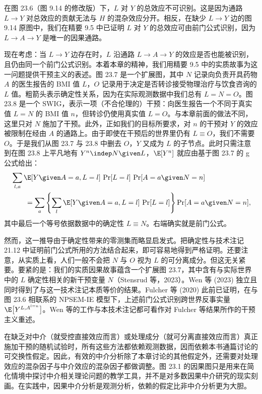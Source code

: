 \begin{techpoint}[路径特定效应与前门公式]
\setlength{\parindent}{2em}
在图 23.6（图 9.14 的修改版）下，$L$ 对 $Y$ 的总效应不可识别。这是因为通路 $L\rightarrow Y$ 对总效应的贡献无法与 $H$ 的混杂效应分开。相反，在缺少 $L\rightarrow Y$ 边的图 9.14 原图中，我们在精要 9.5 中已证明 $L$ 对 $Y$ 的总效应可由前门公式识别，因为 $L\rightarrow A\rightarrow Y$ 是唯一的因果通路。

现在考虑：当 $L\rightarrow Y$ 边存在时，$L$ 沿通路 $L\rightarrow A\rightarrow Y$ 的效应是否也能被识别，且仍由同一个前门公式识别。本着本章的精神，我们用精要 9.5 中的实质故事为这一问题提供干预主义的表述。图 23.7 是一个扩展图，其中 $N$ 记录向负责开具药物 $A$ 的医生报告的 BMI 值 $L$，$O$ 记录用于决定是否转诊接受物理治疗与饮食咨询的 $L$ 值。粗箭头表示确定性关系，因为在实际观测数据中我们总有 $L=N=O$。图 23.8 是一个 SWIG，表示一项（不合伦理的）干预：向医生报告一个不同于真实值 $L=N$ 的 BMI 值 $n$，但转诊仍使用真实值 $L=O$。与本章前面的做法不同，这里只对 $N$ 施加了干预。此外，正如我们的目标所要求，对 $n$ 的干预对 $Y$ 的效应被限制在经由 $A$ 的通路上。由于即使在干预后的世界里仍有 $L\equiv O$，我们不需要 $O$。于是我们从图 23.7 与 23.8 中删去 $O$，$Y$ 又成为 $L$ 的子节点。此时只需注意到在图 23.8 上平凡地有 $Y^{n}\indep N\given L$，$\E[Y^{n}]$ 就应由基于图 23.7 的 g 公式给出：
\begin{align*}
&\sum_{l,a} \E[Y\given A=a,L=l]\,\Pr[L=l]\,\Pr[A=a\given N=n]\\
&\qquad= \sum_a \left\{\sum_l \E[Y\given A=a,L=l]\,\Pr[L=l]\right\}\Pr[A=a\given N=n],
\end{align*}
其中最后一个等号依据数据中的确定性 $L\equiv N$。右端确实就是前门公式。

然而，这一推导由于确定性带来的零测集而略显启发式。把确定性与技术注记 21.12 中证明前门公式所用的方法结合起来，即可容易地得到严格证明。还要注意，从实质上看，人们一般不会把 $N$ 与 $O$ 视为 $L$ 的可分离成分。但这无关紧要。要紧的是：我们的实质因果故事蕴含一个扩展图 23.7，其中含有与实际世界中的 $L$ 确定性相关的新干预变量 $N$（Stensrud 等，2023）。Wen 等 (2023) 独立且同时得到了与这一技术注记本质等价的结果。Fulcher 等 (2020) 此前已证明，在与图 23.6 相联系的 NPSEM-IE 模型下，上述前门公式识别跨世界反事实量 $\E\big[Y^{L,A^{l=n}}\big]$。Wen 等的工作与本技术注记都可看作对 Fulcher 等结果所作的干预主义重述。
\end{techpoint}

在缺乏对中介（就受控直接效应而言）或处理成分（就可分离直接效应而言）真正施加干预的随机试验时，所有这些方法都依赖观测数据，因而依赖本书通篇讨论的可交换性假定。因此，有效的中介分析除了本章讨论的其他假定外，还需要对处理效应的混杂因子与中介效应的混杂因子都做调整。图 23.1 的因果图只是用来在简化情境中探讨中介相关理论问题的教学工具，并不是对多数因果中介研究的现实刻画。在实践中，因果中介分析是观测分析，依赖的假定比非中介分析更为大胆。
